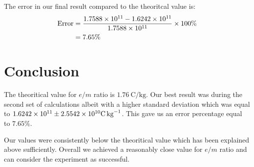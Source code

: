 \documentclass[../main.tex]{subfiles}
\begin{document}
The error in our final result compared to the theoritcal value is:
\begin{align*}
	\textrm{Error} &= \frac{\num{1.7588e11} - \SI{1.6242e+11}{}}{\num{1.7588e11}} \times 100\% \\ 
		       &= 7.65\%
\end{align*}

\section{Conclusion}
The theoritical value for $e/m$ ratio is $\SI{1.76}{\coulomb\per\kilogram}$. 
Our best result was during the second set of calculations albeit with a higher standard deviation which was equal to $\SI{1.6242e+11}{} \pm \SI{2.5542e+10}{} \si{\coulomb\per\kilogram}$.
This gave us an error percentage equal to $7.65\%$.

Our values were consistently below the theoritical value which has been explained above sufficiently.
Overall we achieved a reasonably close value for $e/m$ ratio and can consider the experiment as successful.
\end{document}
